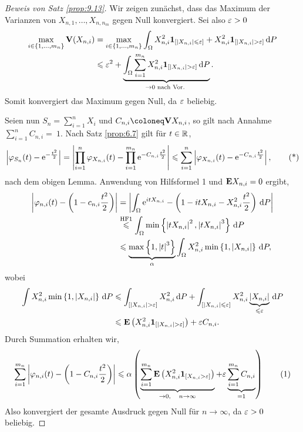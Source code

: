 \begin{proof}[Beweis von Satz \ref{prop:9.13}]
Wir zeigen zunächst, dass das Maximum der Varianzen von
$X_{n,1},\ldots,X_{n,n_m}$ gegen Null konvergiert. Sei also $\varepsilon > 0$
\begin{align*}
\max_{i\in\setd{1,\ldots,m_n}} \V(X_{n,i})
&=
\max_{i\in\setd{1,\ldots,m_n}} 
\int_\Omega X_{n,i}^2 \Id_{[\abs{X_{n,i}}\le \ep]} + 
X_{n,i}^2\Id_{[\abs{X_{n,i}}> \ep]}\dP\\
&\le \ep^2 + \underbrace{\int_\Omega
\sum_{i=1}^{m_n}X_{n,i}^2\Id_{[\abs{X_{n,i}}> \ep]}\dP}_{\to 0\text{ nach Vor.
}}.
\end{align*}
Somit konvergiert das Maximum gegen Null, da $\varepsilon$ beliebig.

Seien nun $S_n = \sum_{i=1}^n X_i$ und $C_{n,i}\defl\V X_{n,i}$, so gilt nach
Annahme $\sum_{i=1}^nC_{n,i}=~1$. Nach Satz \ref{prop:6.7} gilt für $t\in\mathbb{R}$,
\begin{align*}
\left|\varphi_{S_n}(t)-\mathrm{e}^{-\frac{t^2}{2}}\right| = 
\left|\prod_{i=1}^n \varphi_{X_{n,i}}(t)-\prod_{i=1}^{m_n} \mathrm{e}^{-C_{n,i}\frac{t^2}{2}}\right|
\leqslant \sum_{i=1}^n \left|\varphi_{X_{n,i}}(t)-\mathrm{e}^{-C_{n,i}\frac{t^2}2}\right|,\tag{*}
\end{align*}
nach dem obigen Lemma. Anwendung von Hilfsformel 1 und $\textbf{E} X_{n,i}=0$ ergibt,
\begin{align*}
\left|\varphi_{n,i}(t)-\left(1-c_{n,i}\frac{t^2}{2}\right)\right|
&= \left|\int_\Omega
\mathrm{e}^{itX_{n,i}}-\left(1-itX_{n,i}-X_{n,i}^2\frac{t^2}{2}\right)\,\mathrm{d} P\right|\\ 
&\overset{\text{HF1}}{\leqslant} \int_\Omega \min\left\{ \left|tX_{n,i}\right|^2,
\left|tX_{n,i}\right|^3 \right\}\,\mathrm{d} P\\ &\leqslant \underbrace{\max\left\{ 1,\left|t\right|^3 \right\}}_{\alpha}\int_\Omega X_{n,i}^2
\min\left\{ 1,\left|X_{n,i}\right| \right\}\,\mathrm{d} P,
\end{align*}
wobei
\begin{align*}
\int X_{n,i}^2 \min\setd{1,\abs{X_{n,i}}}\dP &\le
\int_{[\abs{X_{n,i}}>\ep]} X_{n,i}^2 \dP
+ \int_{[\abs{X_{n,i}}\le \ep]} X_{n,i}^2\underbrace{\abs{X_{n,i}}}_{\le
\ep}\dP\\
&\le\E\left(X_{n,i}^2\Id_{[\abs{X_{n,i}}>\ep]}\right)
+ \ep C_{n,i}. 
\end{align*}
Durch Summation erhalten wir,
\begin{align*}
\sum_{i=1}^{m_n} \left|\varphi_{n,i}(t)-\left(1-C_{n,i}\frac{t^2}{2}\right)\right|
\leqslant \alpha
\left(\underbrace{\sum_{i=1}^{m_n}\textbf{E}\left(X_{n,i}^2\mathbf{1}_{[X_{n,i}>\varepsilon]}\right)}_{\to
0,\quad n\to\infty} + \varepsilon\underbrace{\sum_{i=1}^{m_n}C_{n,i}}_{=1}\right)\tag{1}
\end{align*}
Also konvergiert der gesamte Ausdruck gegen Null für $n\to\infty$, da $\varepsilon > 0$
beliebig.


\end{proof}
